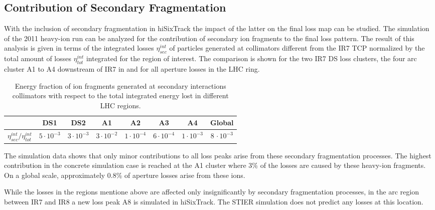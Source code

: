 \subsection{Contribution of Secondary Fragmentation}

With the inclusion of secondary fragmentation in hiSixTrack the impact of the latter on the final loss map can be studied. The simulation of the 2011 heavy-ion run can be analyzed for the contribution of secondary ion fragments to the final loss pattern. The result of this analysis is given in terms of the integrated losses $\eta_{sec}^{int}$ of particles generated at collimators different from the IR7 TCP normalized by the total amount of losses $\eta_{tot}^{int}$ integrated for the region of interest. The comparison is shown for the two IR7 DS loss clusters, the four arc cluster A1 to A4 downstream of IR7 in  and for all aperture losses in the LHC ring. 
%
\begin{table}[b]
\centering
\caption{Energy fraction of ion fragments generated at secondary interactions collimators with respect to the total integrated energy lost in different LHC regions. }
\label{tab:secondary}
\begin{tabular}{cccccccc}
                                \toprule                                             & DS1              & DS2              & A1                 & A2                & A3                & A4              & Global \\ \midrule
$\eta_{sec}^{int}/\eta^{int}_{tot}$& $5\cdot 10^{-3}$ & $3\cdot 10^{-3}$ & $3\cdot 10^{-2}$ & $1 \cdot 10^{-4}$ & $6 \cdot 10^{-4}$ & $1\cdot10^{-3}$ & $8\,\cdot10^{-3}$  \\ \bottomrule
\end{tabular}
\end{table}
%

The simulation data shows that only minor contributions to all loss peaks arise from these secondary fragmentation processes. The highest contribution in the concrete simulation case is reached at the A1 cluster where 3\% of the losses are caused by these heavy-ion fragments. On a global scale, approximately 0.8\% of aperture losses arise from these ions. 

While the losses in the regions mentione above are affected only insignificantly by secondary fragmentation processes, in the arc region between IR7 and IR8 a new loss peak A8 is simulated in hiSixTrack. The STIER simulation does not predict any losses at this location. 

